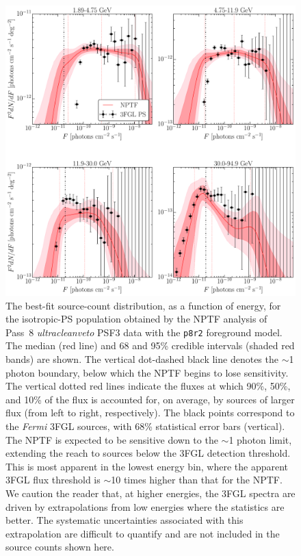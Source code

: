 \begin{figure}[tb] %
   \centering
   \includegraphics[width=\textwidth]{ch-igrb/plots/Rp8RBlw1-1-SourceCounts-final-700-E15-p8-3br.pdf} 
   \caption{The best-fit source-count distribution, as a function of energy, for the isotropic-PS population obtained by the NPTF analysis of Pass~8 {\it ultracleanveto} PSF3 data with the \texttt{p8r2} foreground model.  The median (red line) and 68 and 95\% credible intervals (shaded red bands) are shown.  The vertical dot-dashed black line denotes the $\sim$1 photon boundary, below which the NPTF begins to lose sensitivity.  The vertical dotted red lines indicate the fluxes at which 90\%, 50\%, and 10\% of the flux is accounted for, on average, by sources of larger flux (from left to right, respectively). The black points correspond to the \emph{Fermi} 3FGL sources, with 68\% statistical error bars (vertical).  The NPTF is expected to be sensitive down to the $\sim$1 photon limit, extending the reach to sources below the 3FGL detection threshold.  This is most apparent in the lowest energy bin, where the apparent 3FGL flux threshold is  $\sim$10 times higher than that for the NPTF.   
 We caution the reader that, at higher energies, the 3FGL spectra are driven by extrapolations from low energies where the statistics are better.  The systematic uncertainties associated with this extrapolation are difficult to quantify and are not included in the source counts shown here.}
   \label{fig:dndsdata}
\end{figure}


